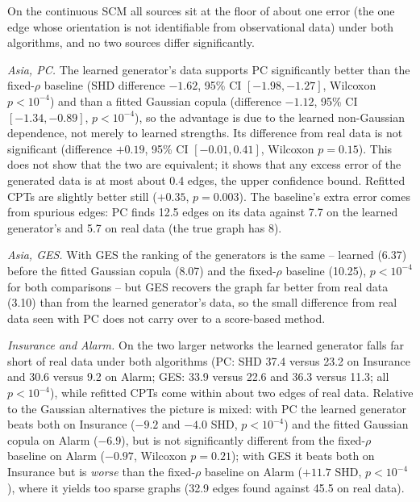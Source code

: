 \documentclass[
  english,
  class=report,
  accentcolor=2c,
  marginpar=false,
  parskip=half-,
  fontsize=11pt,
  ruledheaders=false,
  pdfa=false,
  IMRAD=false,
  thesis={type=master}
]{tudapub}
\begin{document}
On the continuous SCM all sources sit at the floor of about one error
(the one edge whose orientation is not identifiable from observational
data) under both algorithms, and no two sources differ significantly.

\emph{Asia, PC.} The learned generator's data supports PC significantly
better than the fixed-$\rho$ baseline (SHD difference
$-1.62$, 95\% CI $[-1.98, -1.27]$, Wilcoxon
$p < 10^{-4}$) and than a fitted Gaussian copula (difference
$-1.12$, 95\% CI $[-1.34, -0.89]$, $p < 10^{-4}$), so the advantage is due to the learned
non-Gaussian dependence, not merely to learned strengths. Its difference
from real data is not significant (difference
$+0.19$, 95\% CI $[-0.01, 0.41]$, Wilcoxon $p = 0.15$). This does not show
that the two are equivalent; it shows that any excess error of the
generated data is at most about 0.4 edges, the upper confidence bound. Refitted CPTs are
slightly better still ($+0.35$, $p = 0.003$). The baseline's
extra error comes from spurious edges: PC finds 12.5 edges on its data
against 7.7 on the learned generator's and 5.7 on real data (the true
graph has 8).

\emph{Asia, GES.} With GES the ranking of the generators is the same --
learned (6.37) before the fitted Gaussian copula
(8.07) and the fixed-$\rho$ baseline (10.25), $p < 10^{-4}$ for both
comparisons -- but GES recovers the graph far better from real data
(3.10) than from the learned generator's data, so the small difference
from real data seen with PC does not carry over to a score-based method.

\emph{Insurance and Alarm.} On the two larger networks the learned
generator falls far short of real data under both algorithms (PC: SHD
37.4 versus 23.2 on Insurance and 30.6 versus 9.2 on Alarm; GES:
33.9 versus 22.6 and 36.3 versus 11.3; all $p < 10^{-4}$), while refitted
CPTs come within about two edges of real data. Relative to the Gaussian alternatives the picture is
mixed: with PC the learned generator beats both on Insurance
($-9.2$ and $-4.0$ SHD, $p < 10^{-4}$) and the fitted
Gaussian copula on Alarm ($-6.9$), but is not significantly different from the
fixed-$\rho$ baseline on Alarm ($-0.97$, Wilcoxon
$p = 0.21$); with GES it beats both on Insurance but is \emph{worse} than the
fixed-$\rho$ baseline on Alarm ($+11.7$ SHD, $p < 10^{-4}$), where it
yields too sparse graphs (32.9 edges found against 45.5 on real data).
\end{document}
